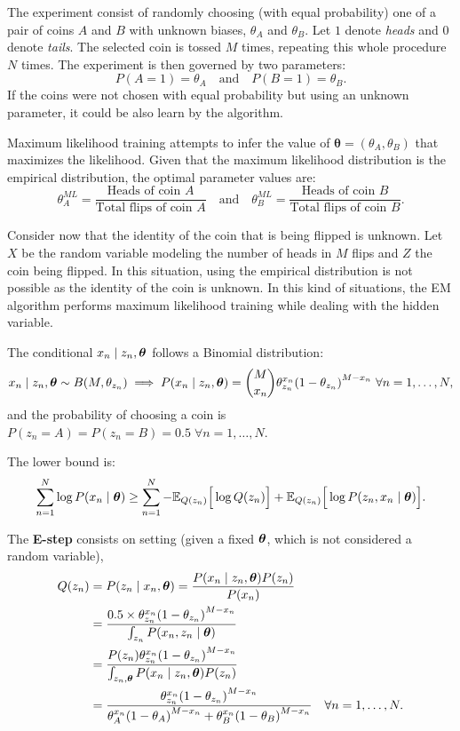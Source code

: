 The experiment consist of randomly choosing (with equal probability) one of a pair of coins \(A\) and \(B\) with unknown biases, \(\theta_{A}\)  and \(\theta_{B}\). Let \(1\) denote \textit{heads} and \(0\) denote \textit{tails}. The selected coin is tossed \(M\)  times, repeating this whole procedure \(N\)  times. The experiment is then governed by two parameters:
\[
  P(A = 1) = \theta_{A} \quad \text{and} \quad P(B = 1) = \theta_{B}.
\]
If the coins were not chosen with equal probability but using an unknown parameter, it could be also learn by the algorithm.

Maximum likelihood training attempts to infer the value of \(\bm{\theta} = (\theta_{A}, \theta_{B})\) that maximizes the likelihood. Given that the maximum likelihood distribution is the empirical distribution, the optimal parameter values are:
\[
  \theta_{A}^{ML} = \frac{\text{Heads of coin }A}{\text{Total flips of coin }A} \quad \text{and} \quad \theta_{B}^{ML} = \frac{\text{Heads of coin }B}{\text{Total flips of coin }B}.
\]

Consider now that the identity of the coin that is being flipped is unknown. Let \(X\) be the random variable modeling the number of heads in \(M\) flips and \(Z\) the coin being flipped. In this situation, using the empirical distribution is not possible as the identity of the coin is unknown. In this kind of situations, the EM algorithm performs maximum likelihood training while dealing with the hidden variable.


The conditional \(x_{n} \mid z_{n}, \bm{\theta}\) follows a Binomial distribution:
\[
  x_{n} \mid z_{n}, \btheta \sim B(M, \theta_{z_{n}}) \implies P(x_{n} \mid z_{n}, \btheta) = \binom{M}{x_{n}}\theta_{z_{n}}^{x_{n}}{(1-\theta_{z_{n}})}^{M - x_{n}} \ \forall n =1,\dots,N,
\]
and the probability of choosing a coin is \(P(z_{n}=A) = P(z_{n}=B)=0.5 \; \forall n =1,\dots,N\).

The lower bound is:
\[
  \sum_{n=1}^{N}\log{P(x_{n} \mid \bm{\theta})} \geq \sum_{n=1}^{N}-\mathbb{E}_{Q(z_{n})}\Big[\log{Q(z_{n})}\Big] + \mathbb{E}_{Q(z_{n})}\Big[\log{P(z_{n}, x_{n} \mid \bm{\theta})}\Big].
\]

The \textbf{E-step} consists on setting (given a fixed \(\bm{\theta}\), which is not considered a random variable),
\[
  \begin{aligned}
    Q(z_{n}) &= P(z_{n} \mid x_{n}, \bm{\theta}) = \frac{P(x_{n} \mid z_{n}, \bm{\theta})P(z_{n})}{P(x_{n})} \\
    &= \frac{0.5 \times \theta_{z_{n}}^{x_{n}}{(1-\theta_{z_{n}})}^{M - x_{n}}}{\int_{z_{n}}P(x_{n},z_{n}\mid \bm{\theta})}\\
    &= \frac{P(z_{n})\theta_{z_{n}}^{x_{n}}{(1-\theta_{z_{n}})}^{M - x_{n}}}{\int_{z_{n}, \bm{\theta}}P(x_{n}\mid z_{n}, \bm{\theta})P(z_{n})}\\
    &= \frac{\theta_{z_{n}}^{x_{n}}{(1-\theta_{z_{n}})}^{M - x_{n}}}{  \theta_{A}^{x_{n}}{(1-\theta_{A})}^{M - x_{n}} + \theta_{B}^{x_{n}}{(1-\theta_{B})}^{M - x_{n}}} \quad \forall n=1,\dots,N.
  \end{aligned}
\]

